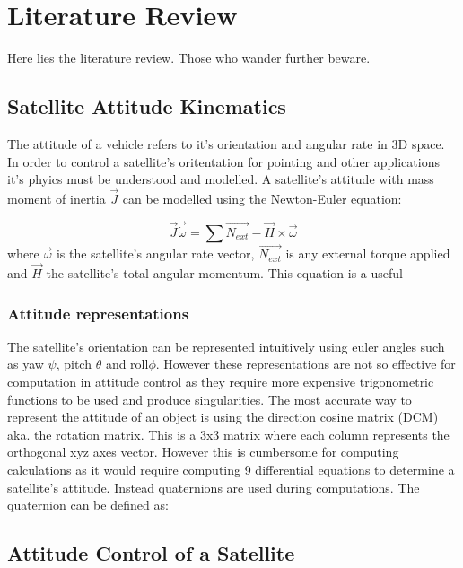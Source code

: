 
\chapter{Literature Review}
\label{chap:literature_review}

Here lies the literature review. Those who wander further beware.

\section{Satellite Attitude Kinematics}

The attitude of a vehicle refers to it's orientation and angular rate in 3D space. In order to control a satellite's
oritentation for pointing and other applications it's phyics must be understood and modelled. 
A satellite's attitude with mass moment of inertia $\vec{J}$ can be modelled using the Newton-Euler equation: 

\begin{equation}
\vec{J}\vec{\dot{\omega}} = \sum{\vec{N_{ext}}} -\vec{H}\times\vec{\omega}
\end{equation}
where $\vec{\omega}$ is the satellite's angular rate vector, $\vec{N_{ext}}$ is any external torque applied and $\vec{H}$
the satellite's total angular momentum. This equation is a useful 

\subsection{Attitude representations}
The satellite's orientation can be represented intuitively using euler angles such as yaw $\psi$, pitch $\theta$ and roll$\phi$.
However these representations are not so effective for computation in attitude control as they require more expensive trigonometric
functions to be used and produce singularities. The most accurate way to represent the attitude of an object is using the direction
cosine matrix (DCM) aka. the rotation matrix. This is a 3x3 matrix where each column represents the orthogonal xyz axes vector. However
this is cumbersome for computing calculations as it would require computing 9 differential equations to determine a satellite's 
attitude. Instead quaternions are used during computations. The quaternion can be defined as:

\section{Attitude Control of a Satellite}
